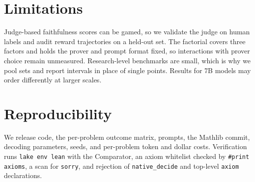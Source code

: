 \documentclass[sigconf,anonymous]{aamas}
\begin{document}
\section{Limitations}
Judge-based faithfulness scores can be gamed, so we validate the judge on human
labels and audit reward trajectories on a held-out set. The factorial covers
three factors and holds the prover and prompt format fixed, so interactions with
prover choice remain unmeasured. Research-level benchmarks are small, which is
why we pool sets and report intervals in place of single points. Results for 7B
models may order differently at larger scales.

\section{Reproducibility}
We release code, the per-problem outcome matrix, prompts, the Mathlib commit,
decoding parameters, seeds, and per-problem token and dollar costs. Verification
runs \texttt{lake env lean} with the Comparator, an axiom whitelist checked by
\texttt{\#print axioms}, a scan for \texttt{sorry}, and rejection of
\texttt{native\_decide} and top-level \texttt{axiom} declarations.




\end{document}
